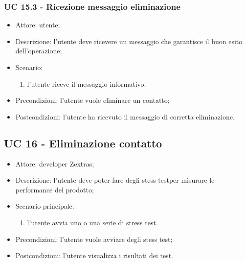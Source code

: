 \subsubsection{UC 15.3 - Ricezione messaggio eliminazione} \label{sec: UC 15.3}
\begin{itemize}
    \item Attore: utente;
    \item Descrizione: l'utente deve ricevere un messaggio che garantisce il buon esito dell'operazione;
    \item Scenario:
        \begin{enumerate}
        \item l'utente riceve il messaggio informativo.
        \end{enumerate}
    
    \item Precondizioni: l'utente vuole eliminare un contatto;
    \item Postcondizioni: l'utente ha ricevuto il messaggio di corretta eliminazione.
\end{itemize}


\subsection{UC 16 - Eliminazione contatto}
\begin{itemize}
    \item Attore: developer Zextras;
    \item Descrizione: l'utente deve poter fare degli stess testper misurare le performance del prodotto;
    \item Scenario principale:
        \begin{enumerate}
        \item l'utente avvia uno o una serie di stress test. 
        \end{enumerate}
    \item Precondizioni: l'utente vuole avviare degli stess test;
    \item Postcondizioni: l'utente visualizza i risultati dei test.
\end{itemize}